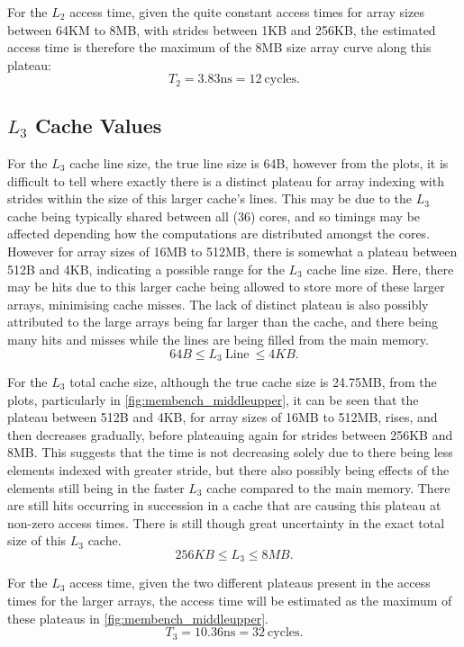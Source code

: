 \documentclass[letterpaper]{article}
\begin{document}
For the $L_2$ access time, given the quite constant access times for array sizes between 64KM to 8MB, with strides between 1KB and 256KB, the estimated access time is therefore the maximum of the 8MB size array curve along this plateau:
$$ T_2 = 3.83 \textrm{ns} = 12~\textrm{cycles}.$$



\subsection{$L_3$ Cache Values}
For the $L_3$ cache line size, the true line size is 64B, however from the plots, it is difficult to tell where exactly there is a distinct plateau for array indexing with strides within the size of this larger cache's lines. This may be due to the $L_3$ cache being typically shared between all (36) cores, and so timings may be affected depending how the computations are distributed amongst the cores. However for array sizes of 16MB to 512MB, there is somewhat a plateau between 512B and 4KB, indicating a possible range for the $L_3$ cache line size. Here, there may be hits due to this larger cache being allowed to store more of these larger arrays, minimising cache misses. The lack of distinct plateau is also possibly attributed to the large arrays being far larger than the cache, and there being many hits and misses while the lines are being filled from the main memory.
$$ 64B \leq L_3 ~\textrm{Line}~ \leq 4KB. $$

For the $L_3$ total cache size, although the true cache size is 24.75MB, from the plots, particularly in \cref{fig:membench_middleupper}, it can be seen that the plateau between 512B and 4KB, for array sizes of 16MB to 512MB, rises, and then decreases gradually, before plateauing again for strides between 256KB and 8MB. This suggests that the time is not decreasing solely due to there being less elements indexed with greater stride, but there also possibly being effects of the elements still being in the faster $L_3$ cache compared to the main memory. There are still hits occurring in succession in a cache that are causing this plateau at non-zero access times. There is still though great uncertainty in the exact total size of this $L_3$ cache.
$$ 256KB \leq L_3 \leq 8MB. $$

For the $L_3$ access time, given the two different plateaus present in the access times for the larger arrays, the access time will be estimated as the maximum of these plateaus in \cref{fig:membench_middleupper}.
$$ T_3 = 10.36 \textrm{ns} = 32~\textrm{cycles}.$$
\end{document}
